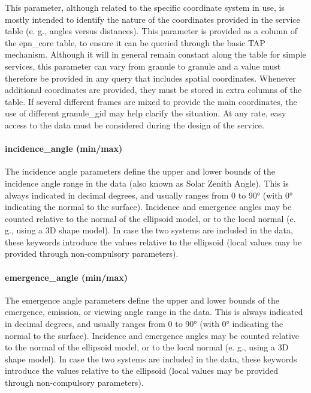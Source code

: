 \documentclass[11pt,a4paper]{ivoa}
\begin{document}
This parameter, although related to the specific coordinate system in use, is mostly intended to identify the nature of the coordinates provided in the service table (e. g., angles versus distances). This parameter is provided as a column of the epn\_core table, to ensure it can be queried through the basic TAP mechanism. Although it will in general remain constant along the table for simple services, this parameter can vary from granule to granule and a value must therefore be provided in any query that includes spatial coordinates. Whenever additional coordinates are provided, they must be stored in extra columns of the table. If several different frames are mixed to provide the main coordinates, the use of different granule\_gid may help clarify the situation. At any rate, easy access to the data must be considered during the design of the service. 

\paragraph{incidence\_angle (min/max)}

The incidence angle parameters define the upper and lower bounds of the incidence angle range in the data (also known as Solar Zenith Angle). This is always indicated in decimal degrees, and usually ranges from 0 to 90° (with 0° indicating the normal to the surface). Incidence and emergence angles may be counted relative to the normal of the ellipsoid model, or to the local normal (e. g., using a 3D shape model). In case the two systems are included in the data, these keywords introduce the values relative to the ellipsoid (local values may be provided through non-compulsory parameters).

\paragraph{emergence\_angle (min/max)}

The emergence angle parameters define the upper and lower bounds of the emergence, emission, or viewing angle range in the data. This is always indicated in decimal degrees, and usually ranges from 0 to 90° (with 0° indicating the normal to the surface). Incidence and emergence angles may be counted relative to the normal of the ellipsoid model, or to the local normal (e. g., using a 3D shape model). In case the two systems are included in the data, these keywords introduce the values relative to the ellipsoid (local values may be provided through non-compulsory parameters).
\end{document}
